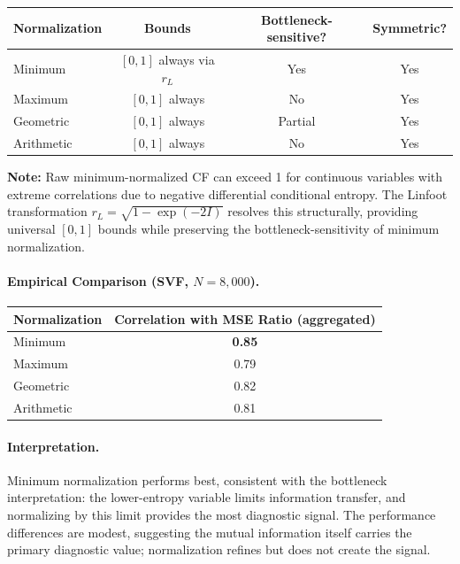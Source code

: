 \documentclass[10pt]{article} %
\theoremstyle{plain}
\theoremstyle{definition}
\begin{document}
\begin{center}
\begin{tabular}{lccc}
\toprule
Normalization & Bounds & Bottleneck-sensitive? & Symmetric? \\
\midrule
Minimum & $[0, 1]$ always via $r_L$ & Yes & Yes \\
Maximum & $[0, 1]$ always & No & Yes \\
Geometric & $[0, 1]$ always & Partial & Yes \\
Arithmetic & $[0, 1]$ always & No & Yes \\
\bottomrule
\end{tabular}
\end{center}

\noindent\textbf{Note:} Raw minimum-normalized CF can exceed 1 for continuous variables with extreme correlations due to negative differential conditional entropy. The Linfoot transformation $r_L = \sqrt{1 - \exp(-2I)}$ resolves this structurally, providing universal $[0,1]$ bounds while preserving the bottleneck-sensitivity of minimum normalization.

\paragraph{Empirical Comparison (SVF, $N=8{,}000$).}

\begin{center}
\begin{tabular}{lc}
\toprule
Normalization & Correlation with MSE Ratio (aggregated) \\
\midrule
Minimum & \textbf{0.85} \\
Maximum & 0.79 \\
Geometric & 0.82 \\
Arithmetic & 0.81 \\
\bottomrule
\end{tabular}
\end{center}

\paragraph{Interpretation.} Minimum normalization performs best, consistent with the bottleneck interpretation: the lower-entropy variable limits information transfer, and normalizing by this limit provides the most diagnostic signal. The performance differences are modest, suggesting the mutual information itself carries the primary diagnostic value; normalization refines but does not create the signal.
\end{document}
